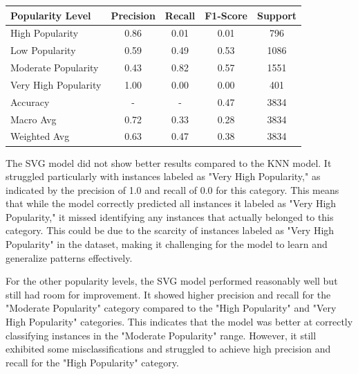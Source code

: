 \documentclass[11pt]{article} %
\begin{document}
\begin{table}[H]
	\centering
	\begin{tabular}{lcccc}
		\toprule
		\textbf{Popularity Level} & \textbf{Precision} & \textbf{Recall} & \textbf{F1-Score} & \textbf{Support} \\
		\midrule
		\hline
		High Popularity           & 0.86               & 0.01            & 0.01              & 796              \\
		Low Popularity            & 0.59               & 0.49            & 0.53              & 1086             \\
		Moderate Popularity       & 0.43               & 0.82            & 0.57              & 1551             \\
		Very High Popularity      & 1.00               & 0.00            & 0.00              & 401              \\
		\hline
		Accuracy                  & -                  & -               & 0.47              & 3834             \\
		Macro Avg                 & 0.72               & 0.33            & 0.28              & 3834             \\
		Weighted Avg              & 0.63               & 0.47            & 0.38              & 3834             \\
		\bottomrule
	\end{tabular}
\end{table}

The SVG model did not show better results compared to the KNN model. It struggled particularly with instances labeled as "Very High Popularity," as indicated by the precision of 1.0 and recall of 0.0 for this category. This means that while the model correctly predicted all instances it labeled as "Very High Popularity," it missed identifying any instances that actually belonged to this category. This could be due to the scarcity of instances labeled as "Very High Popularity" in the dataset, making it challenging for the model to learn and generalize patterns effectively.

For the other popularity levels, the SVG model performed reasonably well but still had room for improvement. It showed higher precision and recall for the "Moderate Popularity" category compared to the "High Popularity" and "Very High Popularity" categories. This indicates that the model was better at correctly classifying instances in the "Moderate Popularity" range. However, it still exhibited some misclassifications and struggled to achieve high precision and recall for the "High Popularity" category.
\end{document}
